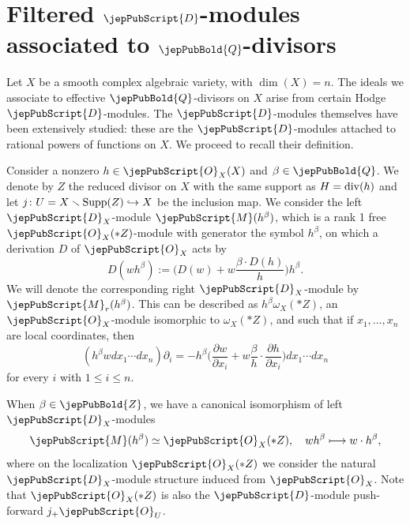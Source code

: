 \section{Filtered \texorpdfstring{\mbox{\normalsize$\jepPubScript{D}$}}{D}-modules associated to \texorpdfstring{\mbox{\normalsize$\jepPubBold{Q}$}}{Q}-divisors}\label{coverings}
Let $X$ be a smooth complex algebraic variety, with $\dim(X)=n$. The ideals we associate to effective $\jepPubBold{Q}$-divisors on $X$ arise from certain Hodge $\jepPubScript{D}$-modules. 
The $\jepPubScript{D}$-modules themselves have been extensively studied: these are the 
$\jepPubScript{D}$-modules attached to rational powers of functions on $X$. We proceed to recall their definition.

Consider a nonzero $h\in\jepPubScript{O}_X(X)$ and $\beta\in\jepPubBold{Q}$. We denote by $Z$ the reduced divisor on $X$ with the same support as
$H={\rm div}(h)$ and let $j\colon U=X\smallsetminus {\rm Supp}(Z)\hookrightarrow X$ be the inclusion map. 
 We consider the left $\jepPubScript{D}_X$-module 
$\jepPubScript{M}(h^{\beta})$, which is a rank 1 free $\jepPubScript{O}_X(*Z)$-module 
with generator the symbol $h^{\beta}$, on which a derivation $D$ of $\jepPubScript{O}_X$ acts by
$$D(wh^{\beta}) :=\Big(D(w) +  w\frac{\beta\cdot D(h)}{h}\Big)h^{\beta}.$$
We will denote the corresponding right $\jepPubScript{D}_X$-module by $\jepPubScript{M}_r(h^{\beta})$.
This can be described as $h^{\beta}\omega_X(*Z)$, an $\jepPubScript{O}_X$-module isomorphic to $\omega_X(*Z)$,
and such that if $x_1,\ldots,x_n$ are local coordinates, then 
$$(h^{\beta}w dx_1\cdots dx_n)\partial_i=- h^{\beta}\Big(\frac{\partial w}{\partial x_i}+ w\frac{\beta}{h}\cdot \frac{\partial h}{\partial x_i}\Big)dx_1\cdots dx_n$$
for every $i$ with $1\leqslant i\leqslant n$. 



\begin{remark}\label{case_ell_1}
When $\beta\in\jepPubBold{Z}$, we have a canonical isomorphism of left $\jepPubScript{D}_X$-modules
\begin{equation}\label{eq_case_ell_1}
\jepPubScript{M}(h^{\beta})\simeq \jepPubScript{O}_X(*Z),\,\,\,\,\,\,wh^{\beta}\longmapsto w \cdot h^{\beta},
\end{equation}
where on the localization $\jepPubScript{O}_X(*Z)$ we consider the natural $\jepPubScript{D}_X$-module structure induced from $\jepPubScript{O}_X$. Note that $\jepPubScript{O}_X(*Z)$
is also the $\jepPubScript{D}$-module push-forward $j_+ \jepPubScript{O}_U$.
\end{remark}

